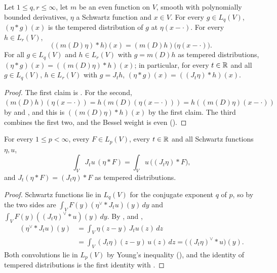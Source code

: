 \begin{lemma}
\label{lem:bessel-potential-convolution-pointwise}
\leanok
{}
Let $1 \leq q, r \leq \infty$, let $m$ be an even function on $V$, smooth with polynomially bounded
derivatives, $\eta$ a Schwartz function and $x \in V$. For every $g \in L_q(V)$,
$(\eta * g)(x)$ is the tempered distribution of $g$ at $\eta(x - \cdot)$. For every
$h \in L_r(V)$,
\[
  \bigl((m(D) \eta) * h\bigr)(x) = (m(D) h)\bigl(\eta(x - \cdot)\bigr) .
\]
For all $g \in L_q(V)$ and $h \in L_r(V)$ with $g = m(D) h$ as tempered distributions,
$(\eta * g)(x) = ((m(D) \eta) * h)(x)$; in particular, for every $t \in \mathbb{R}$ and all
$g \in L_q(V)$, $h \in L_r(V)$ with $g = J_t h$, $(\eta * g)(x) = ((J_t \eta) * h)(x)$.
\end{lemma}

\begin{proof}
\leanok
The first claim is . For the second,
$(m(D) h)(\eta(x - \cdot)) = h(m(D)(\eta(x - \cdot))) = h((m(D) \eta)(x - \cdot))$ by
 and , and this is
$((m(D) \eta) * h)(x)$ by the first claim. The third combines the first two, and the Bessel
weight is even ().
\end{proof}

\begin{theorem}
\label{thm:bessel-potential-convolution}
\leanok
{}
For every $1 \leq p < \infty$, every $F \in L_p(V)$, every $t \in \mathbb{R}$ and all Schwartz functions
$\eta, u$,
\[
  \int_V J_t u \, (\eta * F) = \int_V u \, \bigl((J_t \eta) * F\bigr) ,
\]
and $J_t(\eta * F) = (J_t \eta) * F$ as tempered distributions.
\end{theorem}

\begin{proof}
\leanok
Schwartz functions lie in $L_q(V)$ for the conjugate exponent $q$ of $p$, so by
 the two sides are $\int_V F(y) (\eta^\vee * J_t u)(y) \, dy$ and
$\int_V F(y) ((J_t \eta)^\vee * u)(y) \, dy$. By ,
 and ,
\begin{align*}
  (\eta^\vee * J_t u)(y) &= \int_V \eta(z - y) \, J_t u(z) \, dz \\
  &= \int_V (J_t \eta)(z - y) \, u(z) \, dz = \bigl((J_t \eta)^\vee * u\bigr)(y) .
\end{align*}
Both convolutions lie in $L_p(V)$ by Young's inequality (), and the identity of
tempered distributions is the first identity with .
\end{proof}

